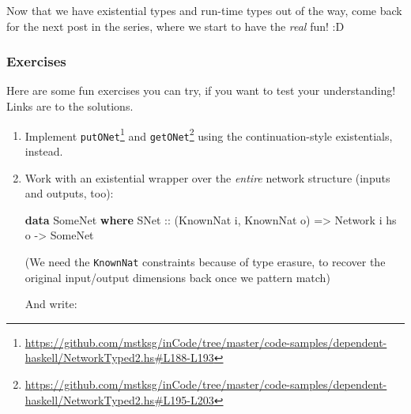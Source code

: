 \documentclass[]{article}
\newenvironment{Shaded}{}{}
\newcommand{\DataTypeTok}[1]{\textcolor[rgb]{0.56,0.13,0.00}{#1}}
\newcommand{\KeywordTok}[1]{\textcolor[rgb]{0.00,0.44,0.13}{\textbf{#1}}}
\newcommand{\NormalTok}[1]{#1}
\newcommand{\OtherTok}[1]{\textcolor[rgb]{0.00,0.44,0.13}{#1}}
\renewcommand{\href}[2]{#2\footnote{\url{#1}}}
\begin{document}
Now that we have existential types and run-time types out of the way, come back
for the next post in the series, where we start to have the \emph{real} fun! :D

\subsubsection{Exercises}\label{exercises}

Here are some fun exercises you can try, if you want to test your understanding!
Links are to the solutions.

\begin{enumerate}
\def\labelenumi{\arabic{enumi}.}
\item
  Implement
  \href{https://github.com/mstksg/inCode/tree/master/code-samples/dependent-haskell/NetworkTyped2.hs\#L188-L193}{\texttt{putONet\textquotesingle{}}}
  and
  \href{https://github.com/mstksg/inCode/tree/master/code-samples/dependent-haskell/NetworkTyped2.hs\#L195-L203}{\texttt{getONet\textquotesingle{}}}
  using the continuation-style existentials, instead.
\item
  Work with an existential wrapper over the \emph{entire} network structure
  (inputs and outputs, too):

\begin{Shaded}
\begin{Highlighting}[]
\KeywordTok{data} \DataTypeTok{SomeNet} \KeywordTok{where}
    \DataTypeTok{SNet}\OtherTok{ ::}\NormalTok{ (}\DataTypeTok{KnownNat}\NormalTok{ i, }\DataTypeTok{KnownNat}\NormalTok{ o)}
         \OtherTok{=\textgreater{}} \DataTypeTok{Network}\NormalTok{ i hs o}
         \OtherTok{{-}\textgreater{}} \DataTypeTok{SomeNet}
\end{Highlighting}
\end{Shaded}

  (We need the \texttt{KnownNat} constraints because of type erasure, to recover
  the original input/output dimensions back once we pattern match)

  And write:


\end{enumerate}
\end{document}

